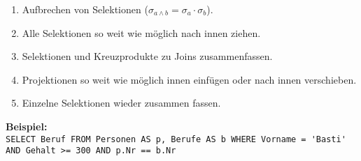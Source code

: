 \documentclass[a4paper,parskip=half*,DIV=15,fontsize=11pt]{scrartcl}
\begin{document}
\begin{enumerate}
  \item Aufbrechen von Selektionen ($\sigma_{a \land b} = \sigma_a \cdot \sigma_b$).
  \item Alle Selektionen so weit wie möglich nach innen ziehen.
  \item Selektionen und Kreuzprodukte zu Joins zusammenfassen.
  \item Projektionen so weit wie möglich innen einfügen oder nach innen verschieben.
  \item Einzelne Selektionen wieder zusammen fassen.
\end{enumerate}
\textbf{Beispiel:} \\
{\fontsize{9pt}{10pt}\selectfont\lstinline{SELECT Beruf FROM Personen AS p, Berufe AS b WHERE Vorname = 'Basti' AND Gehalt >= 300 AND p.Nr == b.Nr}} \\
\end{document}
